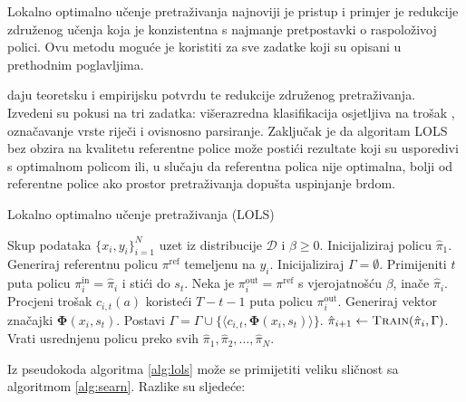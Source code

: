 Lokalno optimalno učenje pretraživanja 
najnoviji je pristup i primjer je redukcije združenog učenja koja je
konzistentna s najmanje pretpostavki o raspoloživoj polici. Ovu metodu moguće je
koristiti za sve zadatke koji su opisani u prethodnim poglavljima.

\cite{daume15lols} daju teoretsku i empirijsku potvrdu te redukcije združenog
pretraživanja. Izvedeni su pokusi na tri zadatka: višerazredna klasifikacija
osjetljiva na trošak ,
označavanje vrste riječi i ovisnosno parsiranje. Zaključak je da algoritam
\textsc{LOLS} bez obzira na kvalitetu referentne police može postići rezultate
koji su usporedivi s optimalnom policom ili, u slučaju da referentna polica nije
optimalna, bolji od referentne police ako prostor pretraživanja dopušta
uspinjanje brdom.

\begin{algorithm}
\caption{Lokalno optimalno učenje pretraživanja (\textsc{LOLS})}\label{alg:lols}
\begin{algorithmic}[1]
\Require Skup podataka $\{x_i, y_i\}_{i=1}^N$ uzet iz distribucije $\mathcal{D}$
         i $\beta \geq 0$. %
\State Inicijaliziraj policu $\hat{\pi}_1$.
  \State Generiraj referentnu policu $\pi^{\text{ref}}$ temeljenu na $y_i$.
  \State Inicijaliziraj $\Gamma = \emptyset$. 
    \State Primijeniti $t$ puta policu $\pi_{i}^{\text{in}} = \hat{\pi}_i$  i stići do $s_t$.  \label{alg:lols:learned}
      \State Neka je  $\pi_{i}^{\text{out}} = \pi^{\text{ref}}$ s vjerojatnošću $\beta$, inače $\hat{\pi}_i$.
      \State Procjeni trošak $c_{i,t}(a)$ koristeći $T-t-1$ puta policu $\pi_{i}^{\text{out}}$.  \label{alg:lols:mixture}
    \EndFor
    \State Generiraj vektor značajki $\mathbf{\Phi}(x_i, s_t)$.
    \State Postavi $\Gamma = \Gamma \cup \{\langle c_{i,t}, \mathbf{\Phi}(x_i, s_t) \rangle\}$.
  \EndFor
  \State $\hat{\pi}_{i+1} \gets \textsc{Train}(\hat{\pi}_i, \Gamma)$.
\EndFor
\State Vrati usrednjenu policu preko svih $\hat{\pi}_1, \hat{\pi}_2, \ldots, \hat{\pi}_N$.
\end{algorithmic}
\end{algorithm}

Iz pseudokoda algoritma \ref{alg:lols} može se primijetiti veliku sličnost sa
algoritmom \ref{alg:searn}. Razlike su sljedeće:

